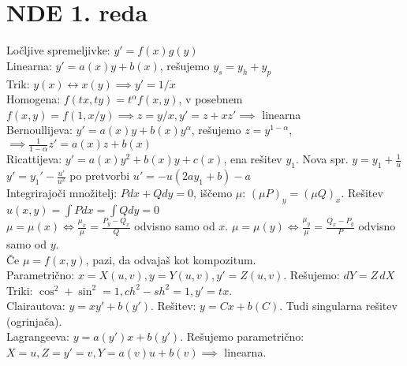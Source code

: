 \documentclass[8pt,a4paper]{amsart}
\theoremstyle{definition} %
\theoremstyle{plain} %
\let\oldint\int
\renewcommand{\int}{\oldint \!}
\begin{document}
\section*{\textbf{NDE 1. reda}}
Ločljive spremeljivke: $y' = f(x)g(y)$ \\
Linearna: $y' = a(x)y + b(x)$, rešujemo $y_s = y_h + y_p$ \\
Trik: $y(x) \leftrightarrow x(y) \implies y' = 1/\dot{x}$ \\
Homogena: $f(tx, ty) = t^\alpha f(x, y)$, v posebnem $f(x, y) = f(1, x/y)
  \implies z = y/x, y' = z + xz' \implies$ linearna \\
Bernoullijeva: $y' = a(x)y + b(x)y^\alpha$, rešujemo $z = y^{1-\alpha}$,
  $\implies \frac{1}{1-\alpha}z' = a(x)z + b(x)$ \\
Ricattijeva: $y' = a(x)y^2 + b(x)y + c(x)$, ena rešitev $y_1$. Nova spr. $y = y_1 + \frac{1}{u}$\\
$y'=y_1'-\frac{u'}{u^2}$ po pretvorbi $u'=-u(2ay_1+b)-a$
\\
Integrirajoči množitelj: $Pdx + Qdy = 0$, iščemo $\mu$: $(\mu P)_y = (\mu Q)_x$.
Rešitev $u(x, y) = \int Pdx = \int Qdy = 0$ \\
\hspace*{20pt} $\mu = \mu(x) \iff \frac{\mu_x}{\mu} = \frac{P_y - Q_x}{Q}$ odvisno samo od $x$.
               $\mu = \mu(y) \iff \frac{\mu_y}{\mu} = \frac{Q_x - P_y}{P}$ odvisno samo od $y$. \\
\hspace*{20pt} Če $\mu = f(x, y)$, pazi, da odvajaš kot kompozitum.\\
Parametrično: $x = X(u, v), y = Y(u, v), y' = Z(u, v)$. Rešujemo: $dY = Z \, dX$ \\
\hspace*{20pt} Triki: $\cos^2 + \sin^2 = 1, ch^2 - sh^2 = 1, y' = tx.$\\
Clairautova: $y = xy' + b(y')$. Rešitev: $y = C x + b(C)$. Tudi singularna
rešitev (ogrinjača). \\
Lagrangeeva: $y = a(y')x + b(y')$. Rešujemo parametrično: $X = u, Z = y' = v, Y =
a(v)u + b(v) \implies$ linearna. \\
\end{document}
